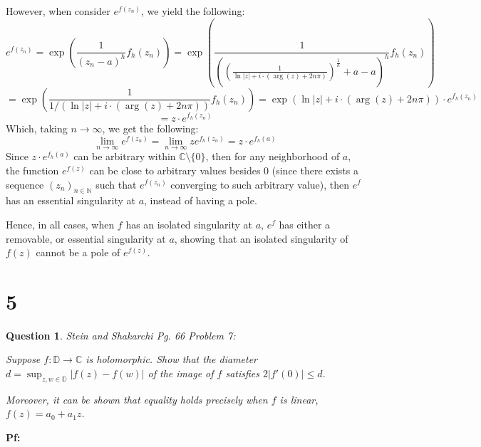 \documentclass{article}
\newtheorem{question}{Question}
\begin{document}
However, when consider $e^{f(z_n)}$, we yield the following:
$$e^{f(z_n)}=\exp\left(\frac{1}{(z_n-a)^h}f_h(z_n)\right)=\exp\left(\frac{1}{\left(\left(\frac{1}{\ln|z|+i\cdot(\arg(z)+2n\pi)}\right)^\frac{1}{h}+a-a\right)^h}f_h(z_n)\right)$$
$$=\exp\left(\frac{1}{1/(\ln|z|+i\cdot(\arg(z)+2n\pi))}f_h(z_n)\right) = \exp\left(\ln|z|+i\cdot(\arg(z)+2n\pi)\right)\cdot e^{f_h(z_n)}$$
$$= z\cdot e^{f_h(z_n)}$$
Which, taking $n\rightarrow\infty$, we get the following:
$$\lim_{n\rightarrow\infty}e^{f(z_n)} = \lim_{n\rightarrow\infty}ze^{f_h(z_n)} = z\cdot e^{f_h(a)}$$
Since $z\cdot e^{f_h(a)}$ can be arbitrary within $\mathbb{C}\setminus\{0\}$, then for any neighborhood of $a$, the function $e^{f(z)}$ can be close to arbitrary values besides $0$
(since there exists a sequence $(z_n)_{n\in\mathbb{N}}$ such that $e^{f(z_n)}$ converging to such arbitrary value),
then $e^f$ has an essential singularity at $a$, instead of having a pole.

\hfill

Hence, in all cases, when $f$ has an isolated singularity at $a$, $e^f$ has either a removable, or essential singularity at $a$, showing that an isolated singularity of $f(z)$ cannot be a pole of $e^{f(z)}$.

\hfill

\hfill

\section*{5}
\begin{myBox}[]{}
    \begin{question}
        Stein and Shakarchi Pg. 66 Problem 7:
        
        Suppose $f:\mathbb{D}\rightarrow \mathbb{C}$ is holomorphic. Show that the diameter $d=\sup_{z,w\in\mathbb{D}}|f(z)-f(w)|$ 
        of the image of $f$ satisfies $2|f'(0)| \leq d$.

        Moreover, it can be shown that equality holds precisely when $f$ is linear, $f(z) =
        a_0 + a_1z$.
    \end{question}
\end{myBox}

\textbf{Pf:}
\end{document}
